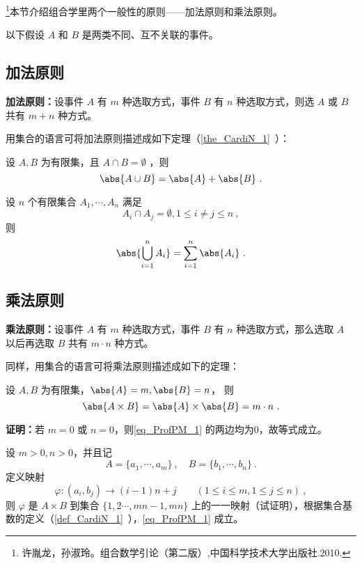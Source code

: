 
\footnote{许胤龙，孙淑玲。组合数学引论（第二版）,中国科学技术大学出版社.2010.}本节介绍组合学里两个一般性的原则——加法原则和乘法原则。

以下假设 $A$ 和 $B$ 是两类不同、互不关联的事件。
\subsection{加法原则}
\textbf{加法原则：}设事件 $A$ 有 $m$ 种选取方式，事件 $B$ 有 $n$ 种选取方式，则选 $A$ 或 $B$ 共有 $m+n$ 种方式。

用集合的语言可将加法原则描述成如下定理（\autoref{the_CardiN_1}~）：
\begin{theorem}{}
设 $A,B$ 为有限集，且 $A\cap B=\emptyset$ ，则
\begin{equation}
\abs{A\cup B}=\abs{A}+\abs{B}~.
\end{equation}
\end{theorem}
\begin{corollary}{}
设 $n$ 个有限集合 $A_1,\cdots,A_n$ 满足
\begin{equation}
A_i\cap A_j=\emptyset,1\leq i\neq j\leq n~,
\end{equation}
则
\begin{equation}
\abs{\bigcup_{i=1}^n A_i}=\sum_{i=1}^n\abs{A_i}~.
\end{equation}

\end{corollary}
\subsection{乘法原则}\label{sub_ProfPM_1}
\textbf{乘法原则：}设事件 $A$ 有 $m$ 种选取方式，事件 $B$ 有 $n$ 种选取方式，那么选取 $A$ 以后再选取 $B$ 共有 $m\cdot n$ 种方式。

同样，用集合的语言可将乘法原则描述成如下的定理：
\begin{theorem}{}\label{the_ProfPM_1}
设 $A,B$ 为有限集，$\abs{A}=m,\abs{B}=n$， 则
\begin{equation}\label{eq_ProfPM_1}
\abs{A\times B}=\abs{A}\times\abs{B}=m\cdot n~.
\end{equation}
\end{theorem}
\textbf{证明：}若 $m=0$ 或 $n=0$，则\autoref{eq_ProfPM_1} 的两边均为0，故等式成立。

设 $m>0,n>0$，并且记
\begin{equation}
A=\{a_1,\cdots,a_m\}~,\quad B=\{b_1,\cdots,b_n\}~.
\end{equation}
定义映射
\begin{equation}
\varphi:(a_i,b_j)\rightarrow (i-1)n+j\qquad (1\leq i\leq m,1\leq j\leq n)~,
\end{equation}
则 $\varphi$ 是 $A\times B$ 到集合 $\{1,2\cdots,mn-1,mn\}$ 上的一一映射（试证明），根据集合基数的定义（\autoref{def_CardiN_1}~），\autoref{eq_ProfPM_1} 成立。

